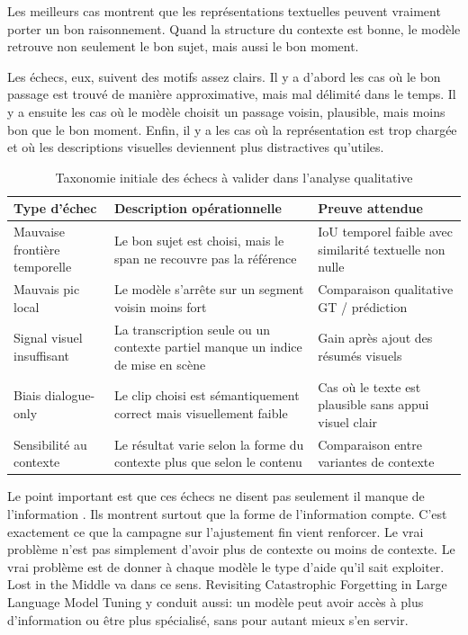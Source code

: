 

Les meilleurs cas montrent que les repr\'esentations textuelles peuvent vraiment porter un bon raisonnement. Quand la structure du contexte est bonne, le mod\`ele retrouve non seulement le bon sujet, mais aussi le bon moment.

Les \'echecs, eux, suivent des motifs assez clairs. Il y a d'abord les cas o\`u le bon passage est trouv\'e de mani\`ere approximative, mais mal d\'elimit\'e dans le temps. Il y a ensuite les cas o\`u le mod\`ele choisit un passage voisin, plausible, mais moins bon que le bon moment. Enfin, il y a les cas o\`u la repr\'esentation est trop charg\'ee et o\`u les descriptions visuelles deviennent plus distractives qu'utiles.

\begin{table}[ht]
\centering
\caption{Taxonomie initiale des \'echecs \`a valider dans l'analyse qualitative}
\label{tab:failure-taxonomy}
\begin{tabularx}{\textwidth}{>{\raggedright\arraybackslash}p{} >{\raggedright\arraybackslash}X >{\raggedright\arraybackslash}p{}}
\toprule
Type d'\'echec & Description op\'erationnelle & Preuve attendue \\
\midrule
Mauvaise fronti\`ere temporelle & Le bon sujet est choisi, mais le span ne recouvre pas la r\'ef\'erence & IoU temporel faible avec similarit\'e textuelle non nulle \\
Mauvais pic local & Le mod\`ele s'arr\^ete sur un segment voisin moins fort & Comparaison qualitative GT / pr\'ediction \\
Signal visuel insuffisant & La transcription seule ou un contexte partiel manque un indice de mise en sc\`ene & Gain apr\`es ajout des r\'esum\'es visuels \\
Biais dialogue-only & Le clip choisi est s\'emantiquement correct mais visuellement faible & Cas o\`u le texte est plausible sans appui visuel clair \\
Sensibilit\'e au contexte & Le r\'esultat varie selon la forme du contexte plus que selon le contenu & Comparaison entre variantes de contexte \\
\bottomrule
\end{tabularx}
\end{table}

Le point important est que ces \'echecs ne disent pas seulement \og il manque de l'information \fg{}. Ils montrent surtout que la forme de l'information compte. C'est exactement ce que la campagne sur l'ajustement fin vient renforcer. Le vrai probl\`eme n'est pas simplement d'avoir plus de contexte ou moins de contexte. Le vrai probl\`eme est de donner \`a chaque mod\`ele le type d'aide qu'il sait exploiter. Lost in the Middle \cite{liu2024_lost} va dans ce sens. Revisiting Catastrophic Forgetting in Large Language Model Tuning \cite{li2024_forgetting} y conduit aussi: un mod\`ele peut avoir acc\`es \`a plus d'information ou \^etre plus sp\'ecialis\'e, sans pour autant mieux s'en servir.

